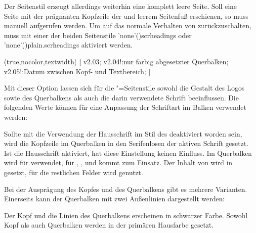 \begin{DeclareEntity*}{}
\begin{DeclareEntity*}{}
\begin{DeclareEntity*}{}
\begin{Declaration}
\begin{Declaration}
\begin{Declaration}
Der Seitenstil  erzeugt allerdings weiterhin eine komplett 
leere Seite. Soll eine Seite mit der prägnanten Kopfzeile der \TnUD und leerem 
Seitenfuß erschienen, so muss 
manuell aufgerufen werden. Um auf das normale Verhalten von \KOMAScript{} 
zurückzuschalten, muss mit  einer der 
beiden Seitenstile \PageStyle'none'(){scrheadings}
oder \PageStyle'none'(){plain.scrheadings} aktiviert 
werden.%
\end{Declaration}
\end{Declaration}
\end{Declaration}
%

\begin{Declaration}
  {}
  (true,nocolor,textwidth)
[%
  v2.03;%
  v2.04!:nur farbig abgesetzter Querbalken;%
  v2.05!:Datum zwischen Kopf- und Textbereich;%
]

Mit dieser Option lassen sich für die "=Seitenstile 
sowohl die Gestalt des Logos sowie des Querbalkens als auch die darin 
verwendete Schrift beeinflussen. Die folgenden Werte können für eine Anpassung 
der Schriftart im Balken verwendet werden:
\begin{DeclareValues}{}
  Sollte mit  die Verwendung der Hausschrift im Stil des 
  \TUDCDs deaktiviert worden sein, wird die Kopfzeile im Querbalken in den 
  Serifenlosen der aktiven Schrift gesetzt. Ist die Hausschrift aktiviert, 
  hat diese Einstellung keinen Einfluss.
  Im Querbalken wird für   
  verwendet, für , , 
   und  kommt  zum 
  Einsatz.
  Der Inhalt von  wird in  gesetzt, für 
  die restlichen Felder wird  genutzt.
\end{DeclareValues}

Bei der Ausprägung des Kopfes und des Querbalkens gibt es mehrere Varianten. 
Einerseits kann der Querbalken mit zwei Außenlinien dargestellt werden:
\begin{DeclareValues}{}
  Der Kopf und die Linien des Querbalkens erscheinen in schwarzer Farbe.
  Sowohl Kopf als auch Querbalken werden in der primären Hausfarbe gesetzt.
\end{DeclareValues}


\end{Declaration}
\end{DeclareEntity*}
\end{DeclareEntity*}
\end{DeclareEntity*}
